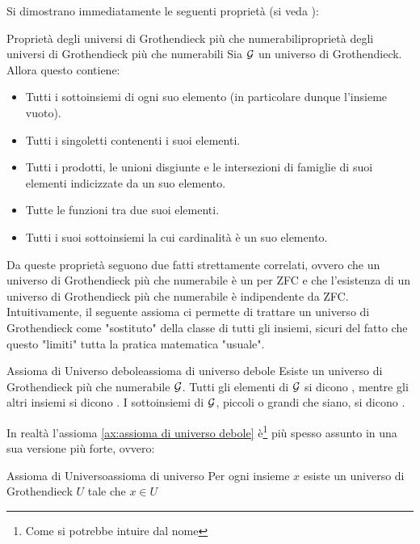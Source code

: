 \documentclass{article}
\begin{document}
Si dimostrano immediatamente le seguenti proprietà (si veda \cite{SGA4}):

\begin{proposition}{Proprietà degli universi di Grothendieck più che numerabili}{proprietà degli universi di Grothendieck più che numerabili}
    Sia $\mathcal{G}$ un universo di Grothendieck. Allora questo contiene:\begin{itemize}
        \item Tutti i sottoinsiemi di ogni suo elemento (in particolare dunque l'insieme vuoto).
        \item Tutti i singoletti contenenti i suoi elementi.
        \item Tutti i prodotti, le unioni disgiunte e le intersezioni di famiglie di suoi elementi indicizzate da un suo elemento.
        \item Tutte le funzioni tra due suoi elementi.
        \item Tutti i suoi sottoinsiemi la cui cardinalità è un suo elemento.
    \end{itemize}
\end{proposition} 

Da queste proprietà seguono due fatti strettamente correlati, ovvero che un universo di Grothendieck più che numerabile è un  per ZFC e che l'esistenza di un universo di Grothendieck più che numerabile è indipendente da ZFC.\\
Intuitivamente, il seguente assioma ci permette di trattare un universo di Grothendieck come "sostituto" della classe di tutti gli insiemi, sicuri del fatto che questo "limiti" tutta la pratica matematica "usuale".

\begin{axiom}{Assioma di Universo debole}{assioma di universo debole}
    Esiste un universo di Grothendieck più che numerabile $\mathcal{G}$. Tutti gli elementi di $\mathcal{G}$ si dicono , mentre gli altri insiemi si dicono . I sottoinsiemi di $\mathcal{G}$, piccoli o grandi che siano, si dicono .
\end{axiom}

In realtà l'assioma \ref{ax:assioma di universo debole} è\footnote{Come si potrebbe intuire dal nome} più spesso assunto in una sua versione più forte, ovvero:

\begin{axiom}{Assioma di Universo}{assioma di universo}
    Per ogni insieme $x$ esiste un universo di Grothendieck $U$ tale che $x \in U$
\end{axiom}
\end{document}
